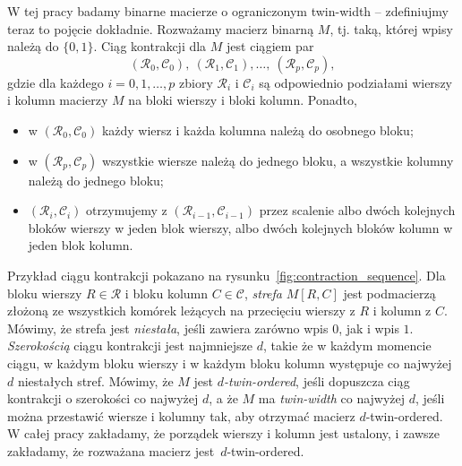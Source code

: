 \documentclass[runningheads]{llncs}
\begin{document}
W tej pracy badamy binarne macierze o ograniczonym twin-width -- zdefiniujmy teraz to pojęcie dokładnie. Rozważamy macierz binarną $M$, tj. taką, której wpisy należą do $\{0,1\}$. Ciąg kontrakcji dla $M$ jest ciągiem par
$$(\mathcal{R}_0, \mathcal{C}_0),\ (\mathcal{R}_1, \mathcal{C}_1), \dots ,\ (\mathcal{R}_p, \mathcal{C}_p),$$
gdzie dla każdego $i=0,1,\dots, p$ zbiory $\mathcal{R}_i$ i $\mathcal{C}_i$ są odpowiednio podziałami wierszy i kolumn macierzy $M$ na bloki wierszy i bloki kolumn. Ponadto,
\begin{itemize}
	\item w $(\mathcal{R}_0, \mathcal{C}_0)$ każdy wiersz i każda kolumna należą do osobnego bloku;
	\item w $(\mathcal{R}_p, \mathcal{C}_p)$ wszystkie wiersze należą do jednego bloku, a wszystkie kolumny należą do jednego bloku;
	\item $(\mathcal{R}_i, \mathcal{C}_i)$ otrzymujemy z $(\mathcal{R}_{i-1}, \mathcal{C}_{i-1})$ przez scalenie albo dwóch kolejnych bloków wierszy w jeden blok wierszy, albo dwóch kolejnych bloków kolumn w jeden blok kolumn.
\end{itemize}
Przykład ciągu kontrakcji pokazano na rysunku~\ref{fig:contraction_sequence}.
 Dla bloku wierszy $R\in \mathcal{R}$ i bloku kolumn $C\in \mathcal{C}$, {\em{strefa}} $M[R,C]$ jest podmacierzą złożoną ze wszystkich komórek leżących na przecięciu wierszy z $R$ i kolumn z $C$. Mówimy, że strefa jest {\em{niestała}}, jeśli zawiera zarówno wpis $0$, jak i wpis $1$. {\em{Szerokością}} ciągu kontrakcji jest najmniejsze $d$, takie że w każdym momencie ciągu, w każdym bloku wierszy i w każdym bloku kolumn występuje co najwyżej $d$ niestałych stref. Mówimy, że $M$ jest {\em{$d$-twin-ordered}}, jeśli dopuszcza ciąg kontrakcji o szerokości co najwyżej $d$, a że $M$ ma {\em{twin-width}} co najwyżej $d$, jeśli można przestawić wiersze i kolumny tak, aby otrzymać macierz $d$-twin-ordered. W całej pracy zakładamy, że porządek wierszy i kolumn jest ustalony, i zawsze zakładamy, że rozważana macierz jest~$d$-twin-ordered.
\end{document}
